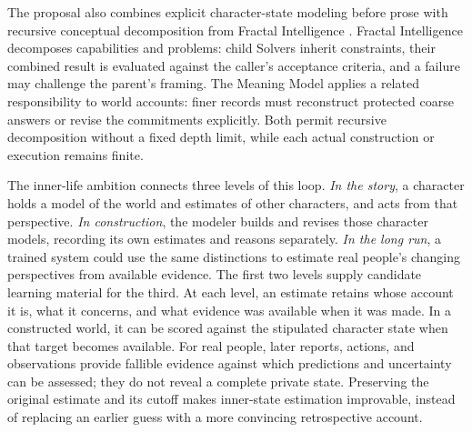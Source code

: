 \documentclass[11pt,a4paper]{article}
\begin{document}
The proposal also combines explicit character-state modeling before prose with
recursive conceptual decomposition from Fractal Intelligence
\cite{westerbergFractal2026}. Fractal Intelligence decomposes capabilities and
problems: child Solvers inherit constraints, their
combined result is evaluated against the caller's acceptance criteria, and a
failure may challenge the parent's framing. The Meaning Model applies a related
responsibility to world accounts: finer records must reconstruct protected
coarse answers or revise the commitments explicitly. Both permit recursive
decomposition without a fixed depth limit, while each actual construction or
execution remains finite.

The inner-life ambition connects three levels of this loop. \emph{In the
story}, a character holds a model of the world and estimates of other
characters, and acts from that perspective. \emph{In construction}, the
modeler builds and revises those character models, recording its own estimates
and reasons separately. \emph{In the long run}, a trained system could use the
same distinctions to estimate real people's changing perspectives from
available evidence. The first two levels supply candidate learning material
for the third. At each level, an estimate retains whose account it is, what it
concerns, and what evidence was available when it was made. In a constructed
world, it can be scored against the stipulated character state when that target
becomes available. For real people, later reports, actions, and observations
provide fallible evidence against which predictions and uncertainty can be
assessed; they do not reveal a complete private state. Preserving the original
estimate and its cutoff makes inner-state estimation improvable, instead of
replacing an earlier guess with a more convincing retrospective account.
\end{document}
